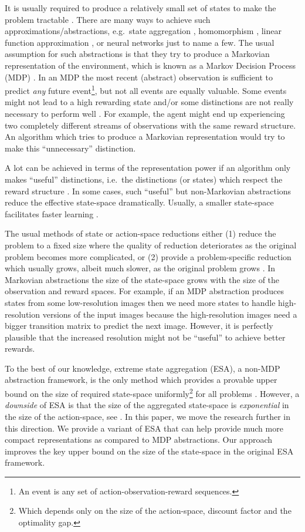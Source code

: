 \documentclass{article} %
\begin{document}
It is usually required to produce a relatively small set of states to make the problem tractable \cite{Lattimore2014}. There are many ways to achieve such approximations/abstractions, e.g.\ state aggregation \cite{Li2006,Abel2016,Hutter2016}, homomorphism \cite{Majeed2019}, linear function approximation \cite{Bertsekas1996}, or neural networks \cite{Mnih2015} just to name a few. The usual assumption for such abstractions is that they try to produce a Markovian representation of the environment, which is known as a Markov Decision Process (MDP) \cite{Hutter2009}. In an MDP  the most recent (abstract) observation is sufficient to predict \emph{any} future event\footnote{An event is any set of action-observation-reward sequences.}, but not all events are equally valuable. Some events might not lead to a high rewarding state and/or some distinctions are not really necessary to perform well \cite{McCallum1995}. For example, the agent might end up experiencing two completely different streams of observations with the same reward structure. An algorithm which tries to produce a Markovian representation would try to make this ``unnecessary'' distinction.

A lot can be achieved in terms of the representation power if an algorithm only makes ``useful'' distinctions, i.e.\ the distinctions (or states) which respect the reward structure \cite{McCallum1995,Hutter2016,Majeed2019}.
In some cases, such ``useful'' but non-Markovian abstractions reduce the effective state-space dramatically. Usually, a smaller state-space facilitates faster learning \cite{Strehl2009,Lattimore2014}.


The usual methods of state or action-space reductions either (1) reduce the problem to a fixed size where the quality of reduction deteriorates as the original problem becomes more complicated, or (2) provide a problem-specific reduction which usually grows, albeit much slower, as the original problem grows \cite{Powell2011}. In Markovian abstractions the size of the state-space grows with the size of the observation and reward spaces. For example, if an MDP abstraction produces states from some low-resolution images then we need more states to handle high-resolution versions of the input images because the high-resolution images need a bigger transition matrix to predict the next image. However, it is perfectly plausible that the increased resolution might not be ``useful'' to achieve better rewards.

To the best of our knowledge, extreme state aggregation (ESA), a non-MDP abstraction framework, is the only method which provides a provable upper bound on the size of required state-space uniformly\footnote{Which depends only on the size of the action-space, discount factor and the optimality gap.} for all problems \cite{Hutter2016}. However, a \emph{downside} of ESA is that the size of the aggregated state-space is \emph{exponential} in the size of the action-space, see .
In this paper, we move the research further in this direction. We provide a variant of ESA that can help provide much more compact representations as compared to MDP abstractions. Our approach improves the key upper bound on the size of the state-space in the original ESA framework.
\end{document}
